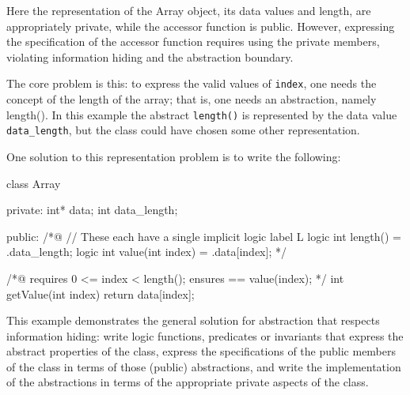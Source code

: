 Here the representation of the Array object, its data values and length, are appropriately private, while the accessor function is public.
However, expressing the specification of the accessor function requires using the private members, violating information hiding and
the abstraction boundary.

The core problem is this: to express the valid values of \lstinline|index|, one needs the concept of the length of the array; that is, one needs an abstraction, namely length(). In this example the abstract \lstinline|length()| is represented by the data value \lstinline|data_length|, but the class could have chosen some other representation.

One solution to this representation problem is to write the following:

\begin{listing-nonumber}
class Array {
  private:
	int* data;
	int data_length;
	
  public:
	/*@ // These each have a single implicit logic label {L}
	   logic int length() = \this.data_length; 
	   logic int value(int index) = \this.data[index];
	*/
	
	/*@ 
	   requires 0 <= index < length();
	   ensures \result == value(index);
	*/
	int getValue(int index) {
		return data[index];
	}
}
\end{listing-nonumber}

This example demonstrates the general solution for abstraction that respects information hiding: write logic functions, predicates or invariants that express the abstract properties of the class, express the specifications of the public members of the class in terms of those (public) abstractions, and write the implementation of the abstractions in terms of the appropriate private aspects of the class.

